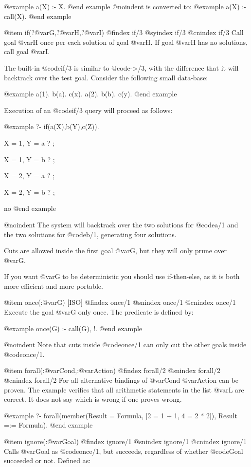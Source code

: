 {{{{@example
 a(X) :- X.
@end example
@noindent
is converted to:
@example
 a(X) :- call(X).
@end example

@item if(?@var{G},?@var{H},?@var{I})
@findex if/3
@syindex if/3
@cnindex if/3
Call goal @var{H} once per each solution of goal @var{H}. If goal
@var{H} has no solutions, call goal @var{I}.

The built-in @code{if/3} is similar to @code{->/3}, with the difference
that it will backtrack over the test goal. Consider the following
small data-base:

@example
a(1).        b(a).          c(x).
a(2).        b(b).          c(y).
@end example

Execution of an @code{if/3} query will proceed as follows:

@example
   ?- if(a(X),b(Y),c(Z)).

X = 1,
Y = a ? ;

X = 1,
Y = b ? ;

X = 2,
Y = a ? ;

X = 2,
Y = b ? ;

no
@end example


@noindent
The system will backtrack over the two solutions for @code{a/1} and the
two solutions for @code{b/1}, generating four solutions.

Cuts are allowed inside the first goal @var{G}, but they will only prune
over @var{G}.

If you want @var{G} to be deterministic you should use if-then-else, as
it is both more efficient and more portable.

@item once(:@var{G}) [ISO]
@findex once/1
@snindex once/1
@cnindex once/1
Execute the goal @var{G} only once. The predicate is defined by:

@example
 once(G) :- call(G), !.
@end example

@noindent
Note that cuts inside @code{once/1} can only cut the other goals inside
@code{once/1}.

@item forall(:@var{Cond},:@var{Action})
@findex forall/2
@snindex forall/2
@cnindex forall/2
For all alternative bindings of @var{Cond} @var{Action} can be
proven. The example verifies that all arithmetic statements in the list
@var{L} are correct. It does not say which is wrong if one proves wrong.

@example
?- forall(member(Result = Formula, [2 = 1 + 1, 4 = 2 * 2]),
                 Result =:= Formula).
@end example

@item ignore(:@var{Goal})
@findex ignore/1
@snindex ignore/1
@cnindex ignore/1
Calls @var{Goal} as @code{once/1}, but succeeds, regardless of whether
@code{Goal} succeeded or not. Defined as:

}}}}
